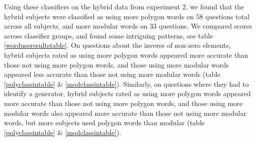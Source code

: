 \documentclass[11pt]{article}
\begin{document}
Using these classifiers on the hybrid data from experiment 2, we found that the hybrid subjects were classified as using more polygon words on 58 questions total across all subjects, and more modular words on 33 questions. We compared scores across classifier groups, and found some intriguing patterns, see table \ref{worduseresultstable}. On questions about the inverse of non-zero elements, hybrid subjects rated as using more polygon words appeared more accurate than those not using more polygon words, and those using more modular words appeared less accurate than those not using more modular words (table \ref{polyclassintable} \& \ref{modclassintable}). Similarly, on questions where they had to identify a generator, hybrid subjects rated as using more polygon words appeared more accurate than those not using more polygon words, and those using more modular words also appeared more accurate than those not using more modular words, but more subjects used polygon words than modular (table \ref{polyclassintable} \& \ref{modclassintable}). \\[11pt]
\end{document}
